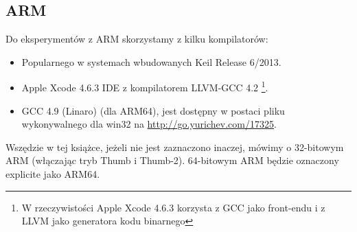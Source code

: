 \subsection{ARM}
\label{sec:hw_ARM}

\myindex{\idevices}
Do eksperymentów z ARM skorzystamy z kilku kompilatorów:

\begin{itemize}
\item Popularnego w systemach wbudowanych Keil Release 6/2013.

\item Apple Xcode 4.6.3 IDE z kompilatorem LLVM-GCC 4.2
\footnote{W rzeczywistości Apple Xcode 4.6.3 korzysta z GCC jako front-endu i z LLVM jako generatora kodu binarnego}.

\item GCC 4.9 (Linaro) (dla ARM64), 
jest dostępny w postaci pliku wykonywalnego dla win32 na \url{http://go.yurichev.com/17325}.

\end{itemize}

Wszędzie w tej książce, jeżeli nie jest zaznaczono inaczej, mówimy o 32-bitowym ARM (włączając tryb Thumb i Thumb-2).
64-bitowym ARM będzie oznaczony explicite jako ARM64.








